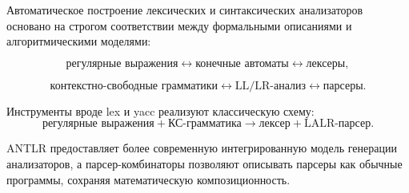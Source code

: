\documentclass[12pt,a4paper]{article}
\theoremstyle{definition}
\theoremstyle{plain}
\begin{document}
Автоматическое построение лексических и синтаксических анализаторов основано на строгом соответствии между формальными описаниями и алгоритмическими моделями:

\[
\text{регулярные выражения}
\leftrightarrow
\text{конечные автоматы}
\leftrightarrow
\text{лексеры},
\]

\[
\text{контекстно-свободные грамматики}
\leftrightarrow
\text{LL/LR-анализ}
\leftrightarrow
\text{парсеры}.
\]

Инструменты вроде lex и yacc реализуют классическую схему:
\[
\text{регулярные выражения} + \text{КС-грамматика}
\to
\text{лексер} + \text{LALR-парсер}.
\]

ANTLR предоставляет более современную интегрированную модель генерации анализаторов, а парсер-комбинаторы позволяют описывать парсеры как обычные программы, сохраняя математическую композиционность.
\end{document}
